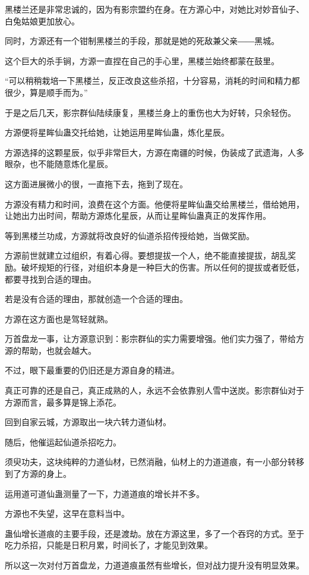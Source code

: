 \begin{this_body}
黑楼兰还是非常忠诚的，因为有影宗盟约在身。在方源心中，对她比对妙音仙子、白兔姑娘更加放心。

同时，方源还有一个钳制黑楼兰的手段，那就是她的死敌兼父亲――黑城。

这个巨大的杀手锏，方源一直捏在自己的手心里，黑楼兰始终都蒙在鼓里。

“可以稍稍栽培一下黑楼兰，反正改良这些杀招，十分容易，消耗的时间和精力都很少，算是顺手而为。”

于是之后几天，影宗群仙陆续康复，黑楼兰身上的重伤也大为好转，只余轻伤。

方源便将星眸仙蛊交托给她，让她运用星眸仙蛊，炼化星辰。

方源选择的这颗星辰，似乎非常巨大，方源在南疆的时候，伪装成了武遗海，人多眼杂，也不能随意炼化星辰。

这方面进展微小的很，一直拖下去，拖到了现在。

方源没有精力和时间，浪费在这个方面。他便将星眸仙蛊交给黑楼兰，借给她用，让她出力出时间，帮助方源炼化星辰，从而让星眸仙蛊真正的发挥作用。

等到黑楼兰功成，方源就将改良好的仙道杀招传授给她，当做奖励。

方源前世就建立过组织，有着心得。要想提拔一个人，绝不能直接提拔，胡乱奖励。破坏规矩的行径，对组织本身是一种巨大的伤害。所以任何的提拔或者贬低，都要寻找到合适的理由。

若是没有合适的理由，那就创造一个合适的理由。

方源在这方面也是驾轻就熟。

万首盘龙一事，让方源意识到：影宗群仙的实力需要增强。他们实力强了，带给方源的帮助，也就会越大。

不过，眼下最重要的仍旧还是方源自身的精进。

真正可靠的还是自己，真正成熟的人，永远不会依靠别人雪中送炭。影宗群仙对于方源而言，最多算是锦上添花。

回到自家云城，方源取出一块六转力道仙材。

随后，他催运起仙道杀招吃力。

须臾功夫，这块纯粹的力道仙材，已然消融，仙材上的力道道痕，有一小部分转移到了方源的身上。

运用道可道仙蛊测量了一下，力道道痕的增长并不多。

方源也不失望，这早在意料当中。

蛊仙增长道痕的主要手段，还是渡劫。放在方源这里，多了一个吞窍的方式。至于吃力杀招，只能是日积月累，时间长了，才能见到效果。

所以这一次对付万首盘龙，力道道痕虽然有些增长，但对战力提升没有明显效果。


\end{this_body}
